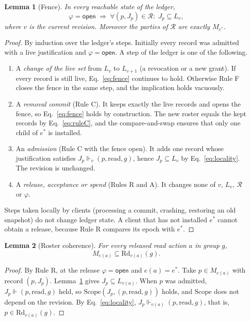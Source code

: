 \documentclass[aps,prx,reprint,superscriptaddress,nofootinbib,floatfix]{revtex4-2}
\newtheorem{lemma}{Lemma}
\theoremstyle{remark}
\newcommand{\Live}{L}                     %
\newcommand{\justifies}{\Vdash}           %
\newcommand{\Rd}{\mathrm{Rd}}             %
\newcommand{\cut}{v}                      %
\newcommand{\roster}{M}
\newcommand{\rec}{\mathcal R}             %
\newcommand{\open}{\textsf{open}}
\newcommand{\Static}{\mathrm{Scope}}
\begin{document}
\begin{lemma}[Fence]\label{lem:fence}
In every reachable state of the ledger,
\begin{equation}
\varphi=\open \;\Longrightarrow\; \forall (p,J_p)\in\rec:\; J_p\subseteq\Live_v ,
\label{eq:fence}
\end{equation}
where $v$ is the current revision. Moreover the parties of $\rec$ are exactly $\roster_{e^\ast}$.
\end{lemma}
\begin{proof}
By induction over the ledger's steps. Initially every record was admitted with a live justification and $\varphi=\open$. A step of the ledger is one of the following.
\begin{enumerate}
\item A \emph{change of the live set} from $\Live_v$ to $\Live_{v+1}$ (a revocation or a new grant). If every record is still live, Eq.~\eqref{eq:fence} continues to hold. Otherwise Rule F closes the fence in the same step, and the implication holds vacuously.
\item A \emph{removal commit} (Rule C). It keeps exactly the live records and opens the fence, so Eq.~\eqref{eq:fence} holds by construction. The new roster equals the kept records by Eq.~\eqref{eq:ruleC}, and the compare-and-swap ensures that only one child of $e^\ast$ is installed.
\item An \emph{admission} (Rule C with the fence open). It adds one record whose justification satisfies $J_p\justifies_v(p,\text{read},g)$, hence $J_p\subseteq\Live_v$ by Eq.~\eqref{eq:locality}. The revision is unchanged.
\item A \emph{release, acceptance or spend} (Rules R and A). It changes none of $v$, $\Live_v$, $\rec$ or $\varphi$.
\end{enumerate}
Steps taken locally by clients (processing a commit, crashing, restoring an old snapshot) do not change ledger state. A client that has not installed $e^\ast$ cannot obtain a release, because Rule R compares its epoch with $e^\ast$.
\end{proof}

\begin{lemma}[Roster coherence]\label{lem:roster}
For every released read action $a$ in group $g$,
\begin{equation}
\roster_{e(a)} \subseteq \Rd_{\cut(a)}(g).
\label{eq:roster}
\end{equation}
\end{lemma}
\begin{proof}
By Rule R, at the release $\varphi=\open$ and $e(a)=e^\ast$. Take $p\in\roster_{e(a)}$ with record $(p,J_p)$. Lemma~\ref{lem:fence} gives $J_p\subseteq\Live_{\cut(a)}$. When $p$ was admitted, $J_p\justifies(p,\text{read},g)$ held, so $\Static(J_p,(p,\text{read},g))$ holds, and $\Static$ does not depend on the revision. By Eq.~\eqref{eq:locality}, $J_p\justifies_{\cut(a)}(p,\text{read},g)$, that is, $p\in\Rd_{\cut(a)}(g)$.
\end{proof}
\end{document}
